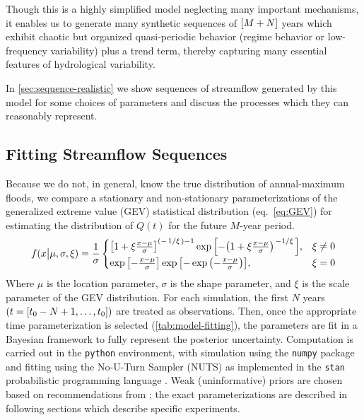 \documentclass[12pt]{article}
\begin{document}
Though this is a highly simplified model neglecting many important mechanisms, it enables us to generate many synthetic sequences of \(\qty[M + N]\) years which exhibit chaotic but organized quasi-periodic behavior (regime behavior or low-frequency variability) plus a trend term, thereby capturing many essential features of hydrological variability.

In \cref{sec:sequence-realistic} we show sequences of streamflow generated by this model for some choices of parameters and discuss the processes which they can reasonably represent.

\subsection{Fitting Streamflow Sequences\label{sec:estimation}}

Because we do not, in general, know the true distribution of annual-maximum floods, we compare a stationary and non-stationary parameterizations of the generalized extreme value (GEV) statistical distribution (eq.~\ref{eq:GEV}) for estimating the distribution of \(Q(t)\) for the future \(M\)-year period.
\begin{equation}
  \label{eq:GEV}
  f(x \big| \mu, \sigma, \xi) = \frac{1}{\sigma}
    \begin{cases}
      \qty[1 + \xi \frac{x - \mu}{\sigma}] ^ {(-\flatfrac{1}{\xi})-1} \exp \qty[-\qty(1+\xi \frac{x - \mu}{\sigma})^{\flatfrac{-1}{\xi}}], & \xi \neq 0 \\
      \exp \qty[-\frac{x-\mu}{\sigma}] \exp \qty[- \exp \qty(- \frac{x-\mu}{\sigma})], & \xi = 0
    \end{cases}
\end{equation}
Where \(\mu{}\) is the location parameter, \(\sigma{}\) is the shape parameter, and \(\xi{}\) is the scale parameter of the GEV distribution.
For each simulation, the first \(N\) years \(\qty(t=[t_0-N+1, \ldots, t_0])\) are treated as observations.
Then, once the appropriate time parameterization is selected (\cref{tab:model-fitting}), the parameters are fit in a Bayesian framework to fully represent the posterior uncertainty.
Computation is carried out in the \texttt{python} environment, with simulation using the \texttt{numpy} package \citep{vanderWalt2011} and fitting using the No-U-Turn Sampler (NUTS) \citep{Hoffman2014} as implemented in the \texttt{stan} probabilistic programming language \citep{Carpenter2016}.
Weak (uninformative) priors are chosen based on recommendations from \citet{Martins2000}; the exact parameterizations are described in following sections which describe specific experiments.
\end{document}
